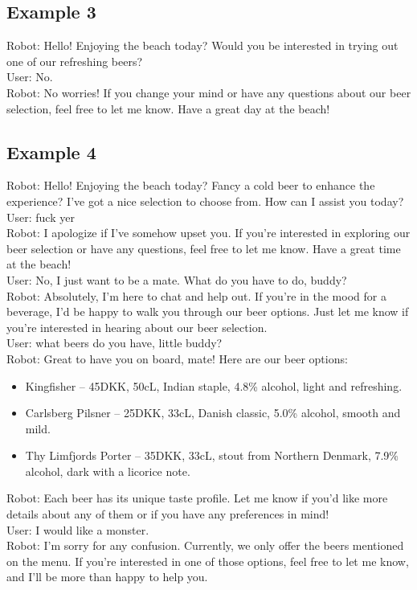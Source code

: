 \documentclass[11pt,a4paper]{article}
\begin{document}
\subsection*{Example 3}
Robot: Hello! Enjoying the beach today? Would you be interested in trying out one of our refreshing beers?\\
User: No.\\
Robot: No worries! If you change your mind or have any questions about our beer selection, feel free to let me know. Have a great day at the beach!

\subsection*{Example 4}
Robot: Hello! Enjoying the beach today? Fancy a cold beer to enhance the experience? I've got a nice selection to choose from. How can I assist you today?\\
User: fuck yer\\
Robot: I apologize if I've somehow upset you. If you're interested in exploring our beer selection or have any questions, feel free to let me know. Have a great time at the beach!\\
User: No, I just want to be a mate. What do you have to do, buddy?\\
Robot: Absolutely, I'm here to chat and help out. If you're in the mood for a beverage, I'd be happy to walk you through our beer options. Just let me know if you're interested in hearing about our beer selection.\\
User: what beers do you have, little buddy?\\
Robot: Great to have you on board, mate! Here are our beer options:
\begin{itemize}
  \item Kingfisher – 45DKK, 50cL, Indian staple, 4.8\% alcohol, light and refreshing.
  \item Carlsberg Pilsner – 25DKK, 33cL, Danish classic, 5.0\% alcohol, smooth and mild.
  \item Thy Limfjords Porter – 35DKK, 33cL, stout from Northern Denmark, 7.9\% alcohol, dark with a licorice note.
\end{itemize}
Robot: Each beer has its unique taste profile. Let me know if you'd like more details about any of them or if you have any preferences in mind!\\
User: I would like a monster.\\
Robot: I'm sorry for any confusion. Currently, we only offer the beers mentioned on the menu. If you're interested in one of those options, feel free to let me know, and I'll be more than happy to help you.\\
\end{document}
